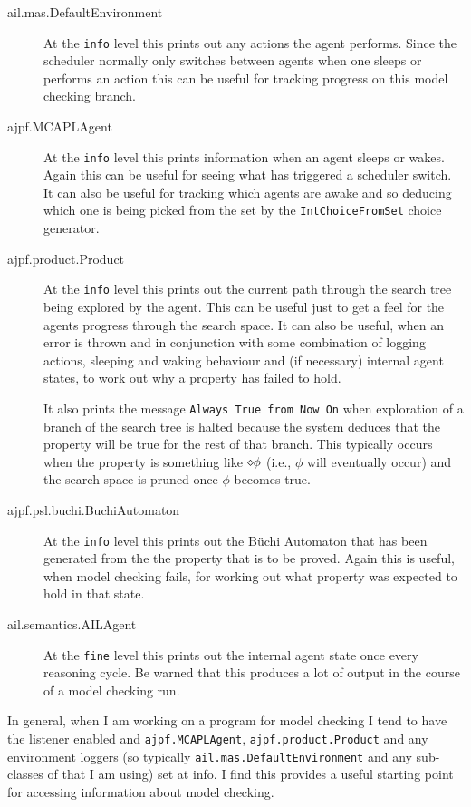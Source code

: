 \begin{description}
\item[ail.mas.DefaultEnvironment] At the \texttt{info} level this prints out any actions the agent performs.  Since the scheduler normally only switches between agents when one sleeps or performs an action this can be useful for tracking progress on this model checking branch.
\item[ajpf.MCAPLAgent] At the \texttt{info} level this prints information when an agent sleeps or wakes.  Again this can be useful for seeing what has triggered a scheduler switch.  It can also be useful for tracking which agents are awake and so deducing which one is being picked from the set by the \texttt{IntChoiceFromSet} choice generator.
\item[ajpf.product.Product] At the \texttt{info} level this prints out the current path through the search tree being explored by the agent.  This can be useful just to get a feel for the agents progress through the search space.  It can also be useful, when an error is thrown and in conjunction with some combination of logging actions, sleeping and waking behaviour and (if necessary) internal agent states, to work out why a property has failed to hold.

It also prints the message \texttt{Always True from Now On} when exploration of a branch of the search tree is halted because the system deduces that the property will be true for the rest of that branch.  This typically occurs when the property is something like $\diamond \phi$ (i.e., $\phi$ will eventually occur) and the search space is pruned once $\phi$ becomes true.
\item[ajpf.psl.buchi.BuchiAutomaton] At the \texttt{info} level this prints out the B\"{u}chi Automaton that has been generated from the the property that is to be proved.  Again this is useful, when model checking fails, for working out what property was expected to hold in that state.
\item[ail.semantics.AILAgent] At the \texttt{fine} level this prints out the internal agent state once every reasoning cycle.  Be warned that this produces a lot of output in the course of a model checking run.
\end{description}

In general, when I am working on a program for model checking I tend to have the  listener enabled and \texttt{ajpf.MCAPLAgent}, \texttt{ajpf.product.Product} and any environment loggers (so typically \texttt{ail.mas.DefaultEnvironment} and any sub-classes of that I am using) set at info.   I find this provides a useful starting point for accessing information about model checking.

